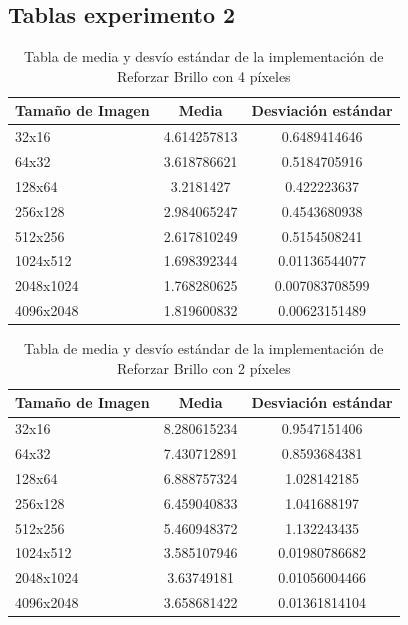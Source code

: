 \documentclass[a4paper]{article}
\begin{document}
\newpage
\subsection{Tablas experimento 2}

\begin{table}[h!]
	\begin{center}
		\begin{tabular}{| l | c | c |}
			\hline
			Tamaño de Imagen & Media & Desviación estándar \\ \hline
			32x16	& 4.614257813	& 0.6489414646 \\
			64x32	& 3.618786621	& 0.5184705916 \\
			128x64	& 3.2181427	& 0.422223637 \\
			256x128	& 2.984065247	& 0.4543680938 \\
			512x256	& 2.617810249	& 0.5154508241 \\
			1024x512	& 1.698392344	& 0.01136544077 \\
			2048x1024	& 1.768280625	& 0.007083708599 \\
			4096x2048	& 1.819600832	& 0.00623151489\\ \hline
		\end{tabular}
		\caption{Tabla de media y desvío estándar de la implementación de Reforzar Brillo con 4 píxeles}
	\end{center}
\end{table}

\begin{table}[h!]
	\begin{center}
		\begin{tabular}{| l | c | c |}
			\hline
			Tamaño de Imagen & Media & Desviación estándar \\ \hline
			32x16	& 8.280615234	& 0.9547151406 \\
			64x32	& 7.430712891	& 0.8593684381 \\
			128x64	& 6.888757324	& 1.028142185 \\
			256x128	& 6.459040833	& 1.041688197 \\
			512x256	& 5.460948372	& 1.132243435 \\
			1024x512	& 3.585107946	& 0.01980786682 \\
			2048x1024	& 3.63749181	& 0.01056004466 \\
			4096x2048	& 3.658681422	& 0.01361814104 \\ \hline
		\end{tabular}
		\caption{Tabla de media y desvío estándar de la implementación de Reforzar Brillo con 2 píxeles}
	\end{center}
\end{table}

%
\end{document}
